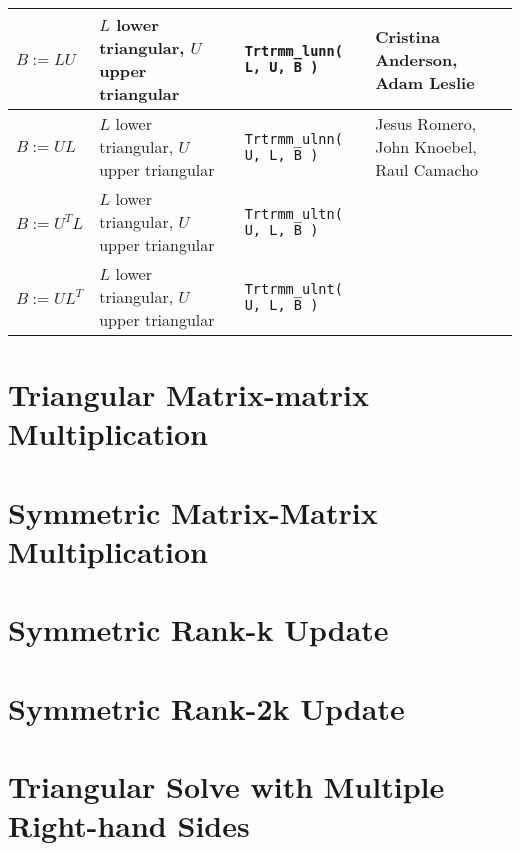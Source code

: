 \documentclass[twoside,openright,12pt]{book}
\begin{document}
\begin{sidewaysfigure}
\begin{center}
\begin{tabular}{| l | p{2in}| l | p{4in} |}
			$ B := L U $ & $ L $ lower triangular, $ U $ upper triangular &
			{\tt Trtrmm\_lunn( L, U, B )} &  Cristina Anderson, Adam Leslie
			\\ \hline
			$ B := U L $ & $ L $ lower triangular, $ U $ upper triangular &
			{\tt Trtrmm\_ulnn( U, L, B )} & Jesus Romero, John Knoebel, Raul Camacho
			\\ \hline
			$ B := U^T L $ & $ L $ lower triangular, $ U $ upper triangular & 
			{\tt Trtrmm\_ultn( U, L, B )} & 
			\\ \hline
			$ B := U L^T $ & $ L $ lower triangular, $ U $ upper triangular &
			{\tt Trtrmm\_ulnt( U, L, B )} &
			\\ \hline
		\end{tabular}
	\end{center}
\end{sidewaysfigure}

\part{Triangular Matrix-matrix Multiplication}





\part{Symmetric Matrix-Matrix Multiplication}



\part{Symmetric Rank-k Update}




\part{Symmetric Rank-2k Update}



\part{Triangular Solve with Multiple Right-hand Sides}


\end{document}
